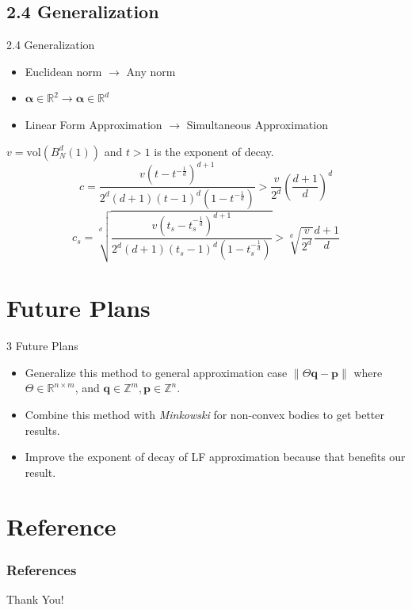 \documentclass[aspectratio=1610]{beamer}
\begin{document}
\subsection{2.4 Generalization}
\begin{frame}{2.4 Generalization}
    \begin{itemize}
        \item Euclidean norm $\rightarrow$ Any norm
        \item $\boldsymbol{\alpha} \in \mathbb{R}^2 \rightarrow     \boldsymbol{\alpha} \in \mathbb{R}^d$
        \item Linear Form Approximation $\rightarrow$ Simultaneous Approximation
    \end{itemize}
    $v=\mathrm{vol}(B_N^d(1))$ and $t>1$ is the exponent of decay.
    \[
        c=\dfrac{v\left(t-t^{-\frac{1}{d}}\right)^{d+1}}{2^d(d+1)(t-1)^d\left(1-t^{-\frac{1}{d}}\right)} > \dfrac{v}{2^d}\left(\dfrac{d+1}{d}\right)^d
    \]
    \pause
    \[
        c_s=\sqrt[d]{\dfrac{v\left(t_s-t_s^{-\frac{1}{d}}\right)^{d+1}}{2^d(d+1)(t_s-1)^d\left(1-t_s^{-\frac{1}{d}}\right)}} > \sqrt[d]{\dfrac{v}{2^d}}\dfrac{d+1}{d}
    \]
\end{frame}

\section{Future Plans}
\begin{frame}{3 Future Plans}
    \begin{itemize}
        \item Generalize this method to general approximation case $\|\Theta\mathbf{q}-\mathbf{p}\|$ where $\Theta\in\mathbb{R}^{n\times m}$, and $\mathbf{q}\in\mathbb{Z}^m,\mathbf{p}\in\mathbb{Z}^n$.
        \item Combine this method with \textit{Minkowski} for non-convex  bodies to get better results\cite{Moshchevitin2002}.
        \item Improve the exponent of decay of LF approximation because that benefits our result.
    \end{itemize}
\end{frame}


\section{Reference}
\begin{frame}[allowframebreaks]
    \frametitle{References}
    \printbibliography
    \begin{center} 
        \Huge Thank You!
    \end{center} 
\end{frame}
\end{document}
